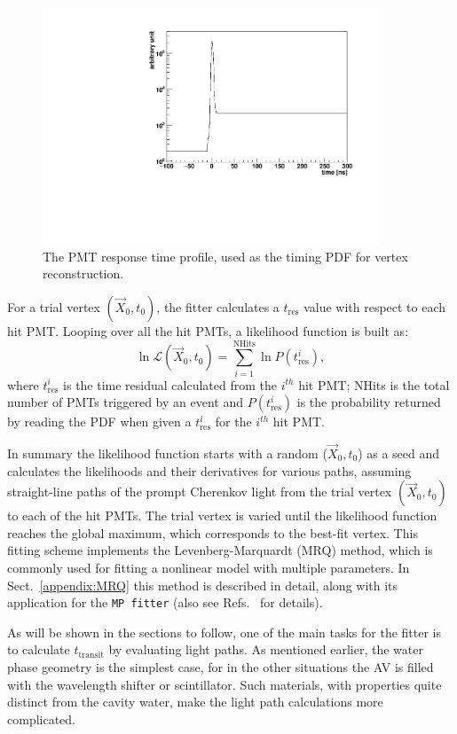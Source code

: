 \begin{figure}[!htb]
	\centering
	\includegraphics[width=10cm]{MPW_timingPDF.pdf}
	\caption{The PMT response time profile, used as the timing PDF for vertex reconstruction.}
	\label{fig:MPW_timingPDF}
\end{figure}

For a trial vertex $(\vec{X}_0,t_0)$, the fitter calculates a $t_{\mathrm{res}}$ value with respect to each hit PMT. Looping over all the hit PMTs, a likelihood function is built as:
\begin{equation}\label{eq:vertexLogL}
\ln\mathcal{L}(\vec{X}_0,t_0)=\sum_{i=1}^{{\mathrm{NHits}}}\ln P(t^i_{\mathrm{res}}),
\end{equation}
where $t^i_{\mathrm{res}}$ is the time residual calculated from the $i^{th}$ hit PMT; NHits is the total number of PMTs triggered by an event and $P(t^i_{\mathrm{res}})$ is the probability returned by reading the PDF when given a $t^i_{\mathrm{res}}$ for the $i^{th}$ hit PMT.

In summary the likelihood function starts with a random ($\vec{X}_0,t_0$) as a seed and calculates the likelihoods and their derivatives for various paths, assuming straight-line paths of the prompt Cherenkov light from the trial vertex $(\vec{X}_0,t_0)$ to each of the hit PMTs. The trial vertex is varied until the likelihood function reaches the global maximum, which corresponds to the best-fit vertex. This fitting scheme implements the Levenberg-Marquardt (MRQ) method, which is commonly used for fitting a nonlinear model with multiple parameters. In Sect.~\ref{appendix:MRQ} this method is described in detail, along with its application for the \texttt{MP fitter} (also see Refs.~\cite{gregory2005bayesian, press2007numerical} for details).

As will be shown in the sections to follow, one of the main tasks for the fitter is to calculate $t_{\mathrm{transit}}$ by evaluating light paths. As mentioned earlier, the water phase geometry is the simplest case, for in the other situations the AV is filled with the wavelength shifter or scintillator. Such materials, with properties quite distinct from the cavity water, make the light path calculations more complicated.

